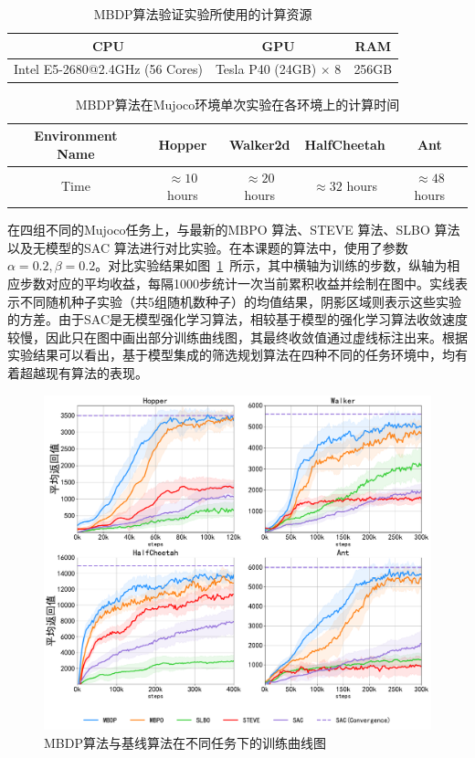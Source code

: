 \begin{table}[hbp]
\centering
\caption{MBDP算法验证实验所使用的计算资源}
\begin{tabular}{ccc}
\toprule
CPU                      & GPU                         & RAM   \\
\midrule
Intel E5-2680@2.4GHz (56 Cores) & Tesla P40 (24GB) $\times$ 8 & 256GB\\
\bottomrule
\end{tabular}
\label{tab:computing-resources}
\end{table}

\begin{table}[hbp]
\centering
\caption{MBDP算法在Mujoco环境单次实验在各环境上的计算时间}
\begin{tabular}{ccccc}
\toprule
Environment Name  & Hopper      & Walker2d    & HalfCheetah & Ant         \\
\midrule
Time & $\approx 10$ hours & $\approx 20$ hours & $\approx 32$ hours & $\approx 48$ hours \\
\bottomrule
\end{tabular}
\label{tab:run-time}
\end{table}

在四组不同的Mujoco任务上，与最新的MBPO \cite{janner2019trust}算法、STEVE \cite{buckman2018sample}算法、SLBO \cite{Luo2019AlgorithmicGuarantees}算法以及无模型的SAC \cite{haarnoja2018soft}算法进行对比实验。在本课题的算法中，使用了参数$\alpha=0.2, \beta=0.2$。对比实验结果如图~\ref{fig:performance}~所示，其中横轴为训练的步数，纵轴为相应步数对应的平均收益，每隔1000步统计一次当前累积收益并绘制在图中。实线表示不同随机种子实验（共5组随机数种子）的均值结果，阴影区域则表示这些实验的方差。由于SAC是无模型强化学习算法，相较基于模型的强化学习算法收敛速度较慢，因此只在图中画出部分训练曲线图，其最终收敛值通过虚线标注出来。根据实验结果可以看出，基于模型集成的筛选规划算法在四种不同的任务环境中，均有着超越现有算法的表现。

\begin{figure}[ht]
  \centering
  \includegraphics[width=\textwidth]{figures/performance.pdf}
  \caption{MBDP算法与基线算法在不同任务下的训练曲线图}
  \label{fig:performance}
\end{figure}

